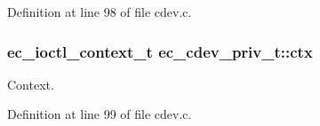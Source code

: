 \-Definition at line 98 of file cdev.\-c.

\subsubsection[{ctx}]{\setlength{\rightskip}{0pt plus 5cm}ec\-\_\-ioctl\-\_\-context\-\_\-t {\bf ec\-\_\-cdev\-\_\-priv\-\_\-t\-::ctx}}\label{structec__cdev__priv__t_a0c0e1018dbfb482ddb1610f8f0b2f848}


\-Context. 



\-Definition at line 99 of file cdev.\-c.

